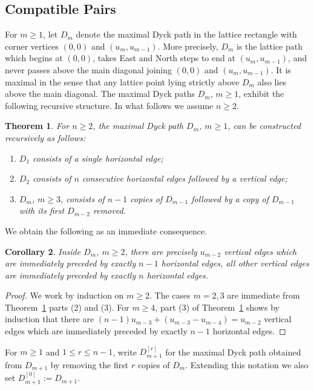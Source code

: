 \documentclass{amsart}
\newtheorem{theorem}{Theorem}[section]
\newtheorem{corollary}[theorem]{Corollary}
\numberwithin{equation}{section}
\begin{document}
\subsection{Compatible Pairs}
For $m\ge1$, let $D_m$ denote the maximal Dyck path in the lattice rectangle with corner vertices $(0,0)$ and $(u_m,u_{m-1})$.  
More precisely, $D_m$ is the lattice path which begins at $(0,0)$, takes East and North steps to end at $(u_m,u_{m-1})$, and never passes above the main diagonal joining $(0,0)$ and $(u_m,u_{m-1})$.  
It is maximal in the sense that any lattice point lying strictly above $D_m$ also lies above the main diagonal.  
The maximal Dyck paths $D_m$, $m\ge1$, exhibit the following recursive structure.
In what follows we assume $n\ge2$.
\begin{theorem}
  \cite[Corollary 2.4]{rupel}
  \label{th:dyck path recursion}
  For $n\ge2$, the maximal Dyck path $D_m$, $m\ge1$, can be constructed recursively as follows:
  \begin{enumerate}
    \item $D_1$ consists of a single horizontal edge;
    \item $D_2$ consists of $n$ consecutive horizontal edges followed by a vertical edge;
    \item $D_m$, $m\ge3$, consists of $n-1$ copies of $D_{m-1}$ followed by a copy of $D_{m-1}$ with its first $D_{m-2}$ removed.
  \end{enumerate}
\end{theorem}

We obtain the following as an immediate consequence.
\begin{corollary}
  \label{cor:short hooks}
  Inside $D_m$, $m\ge2$, there are precisely $u_{m-2}$ vertical edges which are immediately preceded by exactly $n-1$ horizontal edges, all other vertical edges are immediately preceded by exactly $n$ horizontal edges.
\end{corollary}
\begin{proof}
  We work by induction on $m\ge2$.
  The cases $m=2,3$ are immediate from Theorem~\ref{th:dyck path recursion} parts (2) and (3).
  For $m\ge4$, part (3) of Theorem~\ref{th:dyck path recursion} shows by induction that there are $(n-1)u_{m-3}+(u_{m-3}-u_{m-4})=u_{m-2}$ vertical edges which are immediately preceded by exactly $n-1$ horizontal edges.
\end{proof}

For $m\ge1$ and $1\le r\le n-1$, write $D_{m+1}^{[r]}$ for the maximal Dyck path obtained from $D_{m+1}$ by removing the first $r$ copies of $D_m$.
Extending this notation we also set $D_{m+1}^{[0]}:=D_{m+1}$.
\end{document}
